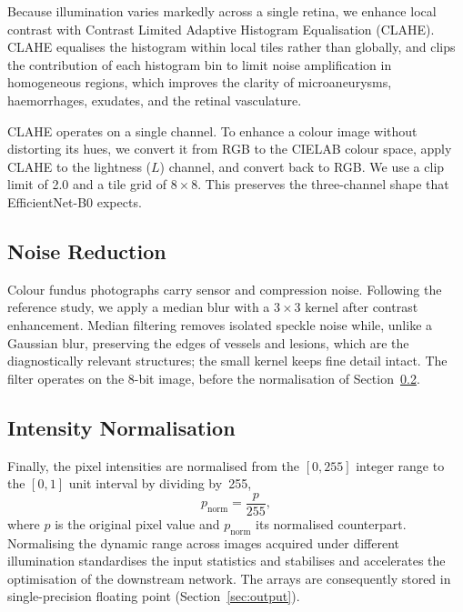 \documentclass[11pt,a4paper]{article}
\begin{document}
Because illumination varies markedly across a single retina, we enhance local
contrast with Contrast Limited Adaptive Histogram Equalisation (CLAHE). CLAHE
equalises the histogram within local tiles rather than globally, and clips the
contribution of each histogram bin to limit noise amplification in homogeneous
regions, which improves the clarity of microaneurysms, haemorrhages, exudates,
and the retinal vasculature.

CLAHE operates on a single channel. To enhance a colour image without
distorting its hues, we convert it from RGB to the CIELAB colour space, apply
CLAHE to the lightness ($L$) channel, and convert back to RGB. We use a clip
limit of \num{2.0} and a tile grid of $8\times8$. This preserves the
three-channel shape that EfficientNet-B0 expects.

\subsection{Noise Reduction}
\label{sec:denoise}

Colour fundus photographs carry sensor and compression noise. Following the
reference study, we apply a median blur with a $3\times3$ kernel after contrast
enhancement. Median filtering removes isolated speckle noise while, unlike a
Gaussian blur, preserving the edges of vessels and lesions, which are the
diagnostically relevant structures; the small kernel keeps fine detail intact.
The filter operates on the 8-bit image, before the normalisation of
Section~\ref{sec:normalise}.

\subsection{Intensity Normalisation}
\label{sec:normalise}

Finally, the pixel intensities are normalised from the $[0,255]$ integer range
to the $[0,1]$ unit interval by dividing by~\num{255},
\begin{equation}
  p_{\text{norm}} = \frac{p}{255},
\end{equation}
where $p$ is the original pixel value and $p_{\text{norm}}$ its normalised
counterpart. Normalising the dynamic range across images acquired under
different illumination standardises the input statistics and stabilises and
accelerates the optimisation of the downstream network. The arrays are
consequently stored in single-precision floating point
(Section~\ref{sec:output}).
\end{document}
